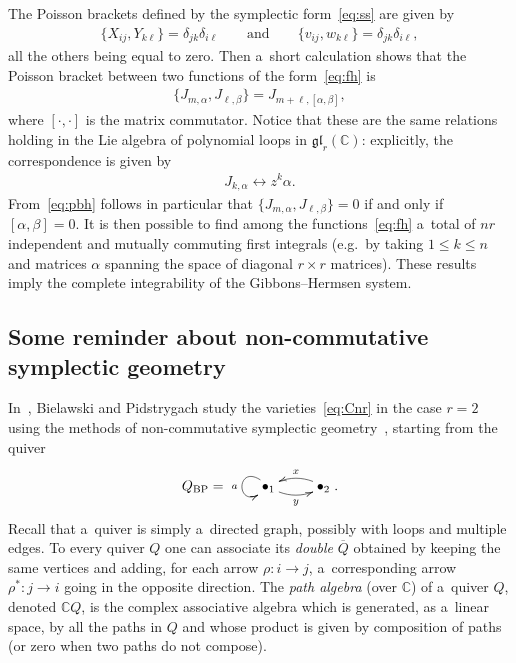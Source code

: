 \documentclass[11pt]{article}
\newcommand{\bb}[1]{\mathbb{#1}}
\newcommand{\app}[3]{#1\colon #2\to #3}
\newcommand{\ol}[1]{\overline{#1}}
\begin{document}
The Poisson brackets def\/ined by the symplectic form~\eqref{eq:ss} are given by
\begin{gather*}%
\{X_{ij},Y_{k\ell}\}=\delta_{jk}\delta_{i\ell}
\qquad
\text{and}
\qquad
\{v_{ij},w_{k\ell}\}=\delta_{jk}\delta_{i\ell},
\end{gather*}
all the others being equal to zero.
Then a~short calculation shows that the Poisson bracket between two functions of the form~\eqref{eq:fh} is
\begin{gather}
\label{eq:pbh}
\{J_{m,\alpha},J_{\ell,\beta}\}=J_{m+\ell,[\alpha,\beta]},
\end{gather}
where $[\cdot,\cdot]$ is the matrix commutator.
Notice that these are the same relations holding in the Lie algebra of polynomial loops in
$\mathfrak{gl}_r(\bb{C})$: explicitly, the correspondence is given by
\begin{gather}
\label{eq:corr}
J_{k,\alpha}\leftrightarrow z^{k}\alpha.
\end{gather}
From~\eqref{eq:pbh} follows in particular that \(\{J_{m,\alpha}, J_{\ell,\beta}\} = 0\) if and only if
\([\alpha,\beta] = 0\).
It is then possible to f\/ind among the functions~\eqref{eq:fh} a~total of \(nr\) independent and mutually
commuting f\/irst integrals (e.g.\
by taking \(1\leq k\leq n\) and matrices \(\alpha\) spanning the space of diagonal \(r\times r\) matrices).
These results imply the complete integrability of the Gibbons--Hermsen system.

\subsection{Some reminder about non-commutative symplectic geometry}

In~\cite{bp08}, Bielawski and Pidstrygach study the varieties~\eqref{eq:Cnr} in the case \(r=2\) using the methods
of non-commutative symplectic geometry~\cite{blb02, ginz01}, starting from the quiver
\begin{gather}
\label{eq:quiv-bp}
Q_{\mathrm{BP}}=\xymatrix{\bullet_{1}\ar@(ul,dl)[]_{a}\ar@/_/[r]_{y}&\bullet_{2}\ar@/_/[l]_{x}}.
\end{gather}
Recall that a~quiver is simply a~directed graph, possibly with loops and multiple edges.
To every quiver \(Q\) one can associate its \emph{double} \(\ol{Q}\) obtained by keeping the same vertices
and adding, for each arrow \(\app{\rho}{i}{j}\), a~corresponding arrow \(\app{\rho^{*}}{j}{i}\) going in
the opposite direction.
The \emph{path algebra} (over \(\bb{C}\)) of a~quiver \(Q\), denoted \(\bb{C}Q\), is the complex
associative algebra which is generated, as a~linear space, by all the paths in \(Q\) and whose product is
given by composition of paths (or zero when two paths do not compose).
\end{document}
